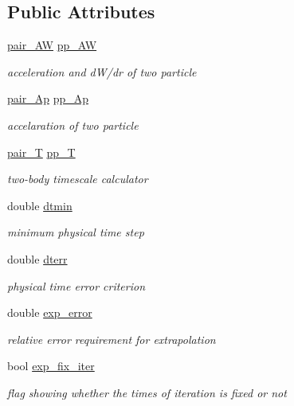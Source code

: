 \subsection*{Public Attributes}
\begin{DoxyCompactItemize}
\item 
\hyperlink{classARC_1_1chainpars_a766866c2e38b475767a4f8529624a378}{pair\+\_\+\+AW} \hyperlink{classARC_1_1chainpars_a1f5e1a080b4f7f81cadd1ec1058fba5b}{pp\+\_\+\+AW}
\begin{DoxyCompactList}\small\item\em acceleration and d\+W/dr of two particle \end{DoxyCompactList}\item 
\hyperlink{classARC_1_1chainpars_aa34d083090c50f572d2126262e169474}{pair\+\_\+\+Ap} \hyperlink{classARC_1_1chainpars_a0eb053974e399ff5c23c98069692c250}{pp\+\_\+\+Ap}
\begin{DoxyCompactList}\small\item\em accelaration of two particle \end{DoxyCompactList}\item 
\hyperlink{classARC_1_1chainpars_a343fccd377d7215a4af2e909f3f9acf6}{pair\+\_\+T} \hyperlink{classARC_1_1chainpars_a09163b4b9e5f44755487b730b5089db4}{pp\+\_\+T}
\begin{DoxyCompactList}\small\item\em two-\/body timescale calculator \end{DoxyCompactList}\item 
double \hyperlink{classARC_1_1chainpars_ae98a65b98d493759187d9790c6d746ef}{dtmin}
\begin{DoxyCompactList}\small\item\em minimum physical time step \end{DoxyCompactList}\item 
double \hyperlink{classARC_1_1chainpars_aad7c1a9303c1bba721d08670961ba3f3}{dterr}
\begin{DoxyCompactList}\small\item\em physical time error criterion \end{DoxyCompactList}\item 
double \hyperlink{classARC_1_1chainpars_aa2d74e007387438a5c9a36a7b29cbd1f}{exp\+\_\+error}
\begin{DoxyCompactList}\small\item\em relative error requirement for extrapolation \end{DoxyCompactList}\item 
bool \hyperlink{classARC_1_1chainpars_abd2d2eab7208c4579dbfd9c624ecdf85}{exp\+\_\+fix\+\_\+iter}
\begin{DoxyCompactList}\small\item\em flag showing whether the times of iteration is fixed or not \end{DoxyCompactList}\end{DoxyCompactItemize}
